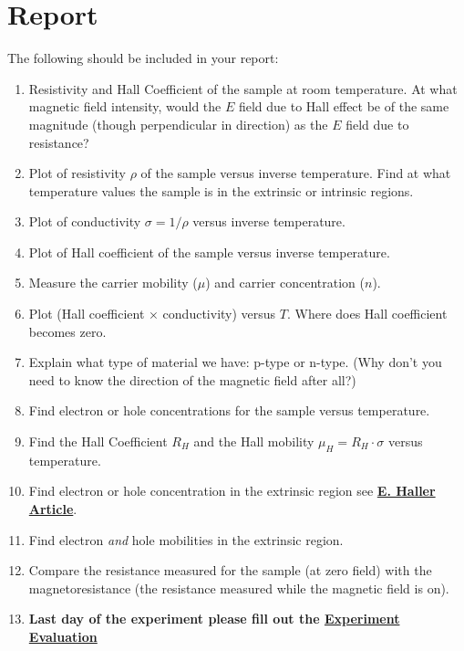 \documentclass{../lab}
\newcommand{\EHallerArticle}{http://physics111.lib.berkeley.edu/Physics111/Reprints/SHE/24-Haller.pdf}
\begin{document}
\section{Report}

The following should be included in your report:

\begin{enumerate}
    \item Resistivity and Hall Coefficient of the sample at room temperature. At what magnetic field intensity, would the $E$ field due to Hall effect be of the same magnitude (though perpendicular in direction) as the $E$ field due to resistance?

    \item Plot of resistivity $\rho$ of the sample versus inverse temperature. Find at what temperature values the sample is in the extrinsic or intrinsic regions.

    \item Plot of conductivity $\sigma = 1/\rho$ versus inverse temperature.

    \item Plot of Hall coefficient of the sample versus inverse temperature.

    \item Measure the carrier mobility ($\mu$) and carrier concentration ($n$).

    \item Plot (Hall coefficient $\times$ conductivity) versus $T$. Where does Hall coefficient becomes zero.

    \item Explain what type of material we have: p-type or n-type. (Why don't you need to know the direction of the magnetic field after all?)

    \item Find electron or hole concentrations for the sample versus temperature.

    \item Find the Hall Coefficient $R_H$ and the Hall mobility $\mu_H = R_H \cdot \sigma$ versus temperature.

    \item Find electron or hole concentration in the extrinsic region see \href{\EHallerArticle}{\textbf{E. Haller Article}}.

    \item Find electron \emph{and} hole mobilities in the extrinsic region.

    \item Compare the resistance measured for the sample (at zero field) with the magnetoresistance (the resistance measured while the magnetic field is on).

    \item \textbf{Last day of the experiment please fill out the \href{\ExperimentEvaluation}{Experiment Evaluation}}
\end{enumerate}
\end{document}
